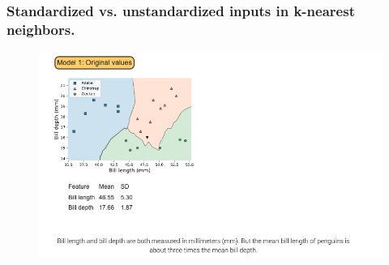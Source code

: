 \documentclass[8pt,dvipsnames]{beamer}
\begin{document}
\begin{frame}
	\frametitle{Standardized vs. unstandardized inputs in k-nearest neighbors.}
	\begin{figure}[ht]
		\centering
		\includegraphics[width=\linewidth]{imgs/knn_39.png}
	\end{figure}
\end{frame}
\end{document}
